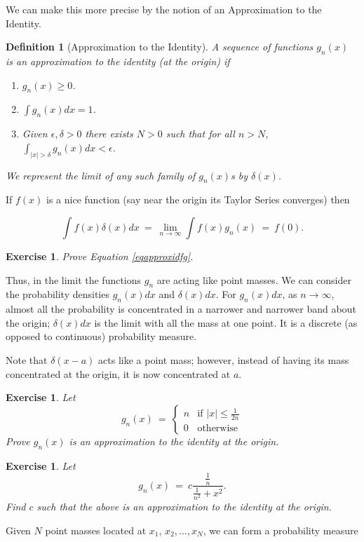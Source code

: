 \documentclass[12pt,letterpaper]{report}
\newcommand\be{\begin{equation}}
\newcommand\ee{\end{equation}}
\newcommand\ben{\begin{enumerate}}
\newcommand\een{\end{enumerate}}
\newtheorem{defi}[thm]{Definition}
\newtheorem{exe}[thm]{Exercise}
\newcommand{\twocase}[5]{#1 \begin{cases} #2 & \text{#3}\\ #4
&\text{#5} \end{cases}   }
\begin{document}
We can make this more precise by the notion of an Approximation to
the Identity.

\begin{defi}[Approximation to the Identity] A sequence of
functions $g_n(x)$ is an approximation to the identity (at the
origin) if

\ben
\item $g_n(x) \ge 0$.
\item $\int g_n(x)dx = 1$.
\item Given $\epsilon, \delta > 0$ there exists $N > 0$ such that for all
$n > N$, $\int_{|x| > \delta} g_n(x) dx < \epsilon$. \een

We represent the limit of any such family of $g_n(x)$s by
$\delta(x)$.
\end{defi}

If $f(x)$ is a nice function (say near the origin its Taylor
Series converges) then

\be\label{eqapproxidfg} \int f(x) \delta(x) dx \ = \ \lim_{n \to
\infty} \int f(x) g_n(x)\ =  \ f(0). \ee

\begin{exe} Prove Equation \ref{eqapproxidfg}. \end{exe}

Thus, in the limit the functions $g_n$ are acting like point
masses. We can consider the probability densities $g_n(x)dx$ and
$\delta(x)dx$. For $g_n(x)dx$, as $n \to \infty$, almost all the
probability is concentrated in a narrower and narrower band about
the origin; $\delta(x)dx$ is the limit with all the mass at one
point. It is a discrete (as opposed to continuous) probability
measure.

Note that $\delta(x-a)$ acts like a point mass; however, instead
of having its mass concentrated at the origin, it is now
concentrated at $a$.

\begin{exe} Let
\be \twocase{g_n(x) \ = \ }{n}{if $|x| \le
\frac{1}{2n}$}{0}{otherwise} \ee Prove $g_n(x)$ is an
approximation to the identity at the origin. \end{exe}

\begin{exe} Let
\be g_n(x) \ = \ c \frac{\frac{1}{n}}{\frac{1}{n^2} + x^2}. \ee
Find $c$ such that the above is an approximation to the identity
at the origin. \end{exe}

Given $N$ point masses located at $x_1$, $x_2, \dots, x_N$, we can
form a probability measure
\end{document}
